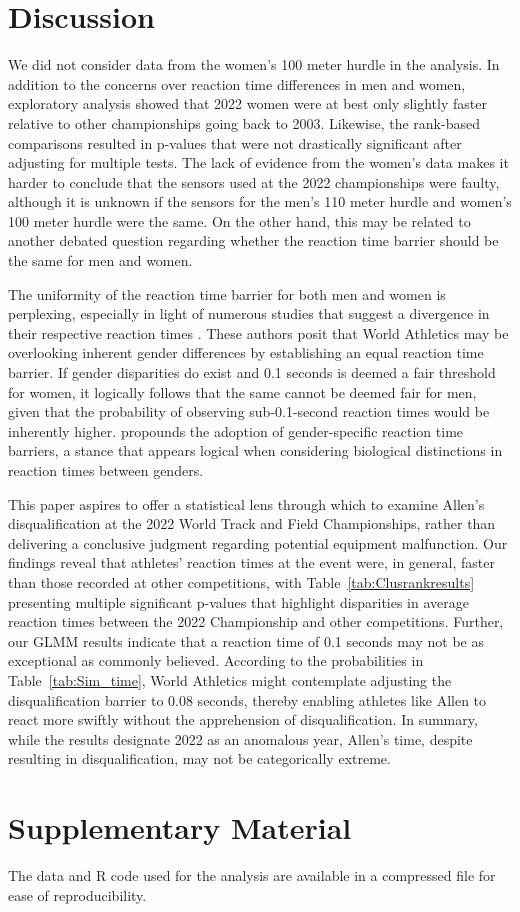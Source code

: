\documentclass[12pt, letterpaper, titlepage]{article}
\begin{document}
\section{Discussion}\label{sec:concludingremarks}


We did not consider data from the women's 100 meter hurdle in the analysis.
In addition to the concerns over reaction time differences in men and
women, exploratory analysis showed that 2022 women were at best only
slightly faster relative to other championships going back to 2003.
Likewise, the rank-based comparisons resulted in p-values
that were not drastically significant after adjusting for multiple tests.
The lack of evidence from the women's data makes it 
harder to conclude that the sensors used at the 2022 championships were faulty, 
although it is unknown if the sensors for the men's 110 meter hurdle and women's
100 meter hurdle were the same. On the other hand, this may be related to 
another debated question regarding whether the reaction time barrier should be 
the same for men and women.


The uniformity of the reaction time barrier for both men and women is
perplexing, especially in light of numerous studies that suggest a divergence in
their respective reaction times \citep[e.g.,][]{lipps2011implications,
  babicc2009reaction, panoutsakopoulos2020gender}. These authors posit that
World Athletics may be overlooking inherent gender differences by establishing
an equal reaction time barrier. If gender disparities do exist and 0.1 seconds
is deemed a fair threshold for women, it logically follows that the same cannot
be deemed fair for men, given that the probability of observing sub-0.1-second
reaction times would be inherently higher. \citet{brosnan2017effects} propounds
the adoption of gender-specific reaction time barriers, a stance that appears
logical when considering biological distinctions in reaction times between
genders.


This paper aspires to offer a statistical lens through which to examine Allen's
disqualification at the 2022 World Track and Field Championships, rather than
delivering a conclusive judgment regarding potential equipment malfunction. Our
findings reveal that athletes' reaction times at the event were, in general,
faster than those recorded at other competitions, with
Table~\ref{tab:Clusrankresults} presenting multiple significant p-values that
highlight disparities in average reaction times between the 2022 Championship
and other competitions. Further, our GLMM results indicate that a reaction time
of 0.1 seconds may not be as exceptional as commonly believed. According to the
probabilities in Table~\ref{tab:Sim_time}, World Athletics might contemplate
adjusting the disqualification barrier to 0.08 seconds, thereby enabling athletes
like Allen to react more swiftly without the apprehension of
disqualification. In summary, while the results designate 2022 as an anomalous
year, Allen's time, despite resulting in disqualification, may not be
categorically extreme.


\section*{Supplementary Material}
The data and R code used for the analysis are available in a compressed file for
ease of reproducibility.



\end{document}
